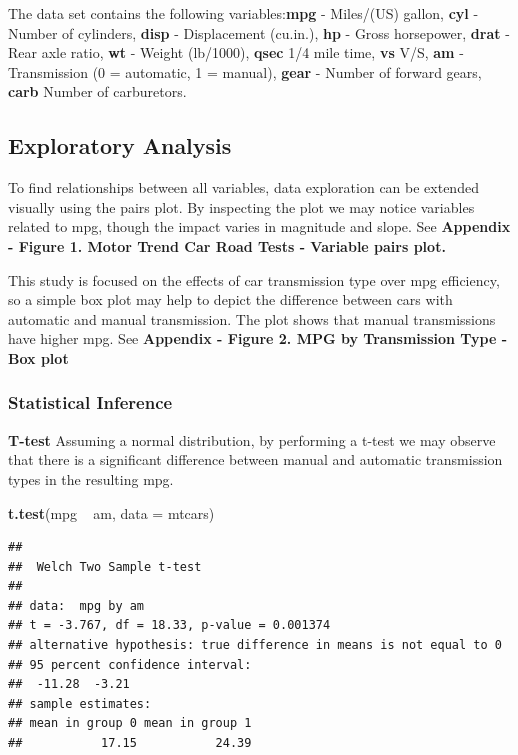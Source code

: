 \documentclass[]{article}
\newenvironment{Shaded}{\begin{snugshade}}{\end{snugshade}}
\newcommand{\KeywordTok}[1]{\textcolor[rgb]{0.13,0.29,0.53}{\textbf{{#1}}}}
\newcommand{\DataTypeTok}[1]{\textcolor[rgb]{0.13,0.29,0.53}{{#1}}}
\newcommand{\StringTok}[1]{\textcolor[rgb]{0.31,0.60,0.02}{{#1}}}
\newcommand{\NormalTok}[1]{{#1}}
\begin{document}
The data set contains the following variables:\textbf{mpg} - Miles/(US)
gallon, \textbf{cyl} - Number of cylinders, \textbf{disp} - Displacement
(cu.in.), \textbf{hp} - Gross horsepower, \textbf{drat} - Rear axle
ratio, \textbf{wt} - Weight (lb/1000), \textbf{qsec} 1/4 mile time,
\textbf{vs} V/S, \textbf{am} - Transmission (0 = automatic, 1 = manual),
\textbf{gear} - Number of forward gears, \textbf{carb} Number of
carburetors.

\subsection{Exploratory Analysis}\label{exploratory-analysis}

To find relationships between all variables, data exploration can be
extended visually using the pairs plot. By inspecting the plot we may
notice variables related to mpg, though the impact varies in magnitude
and slope. See \textbf{Appendix - Figure 1. Motor Trend Car Road Tests -
Variable pairs plot.}

This study is focused on the effects of car transmission type over mpg
efficiency, so a simple box plot may help to depict the difference
between cars with automatic and manual transmission. The plot shows that
manual transmissions have higher mpg. See \textbf{Appendix - Figure 2.
MPG by Transmission Type - Box plot}

\subsubsection{Statistical Inference}\label{statistical-inference}

\textbf{T-test} Assuming a normal distribution, by performing a t-test
we may observe that there is a significant difference between manual and
automatic transmission types in the resulting mpg.

\begin{Shaded}
\begin{Highlighting}[]
\KeywordTok{t.test}\NormalTok{(mpg ~}\StringTok{ }\NormalTok{am, }\DataTypeTok{data =} \NormalTok{mtcars)}
\end{Highlighting}
\end{Shaded}

\begin{verbatim}
## 
##  Welch Two Sample t-test
## 
## data:  mpg by am
## t = -3.767, df = 18.33, p-value = 0.001374
## alternative hypothesis: true difference in means is not equal to 0
## 95 percent confidence interval:
##  -11.28  -3.21
## sample estimates:
## mean in group 0 mean in group 1 
##           17.15           24.39
\end{verbatim}
\end{document}
